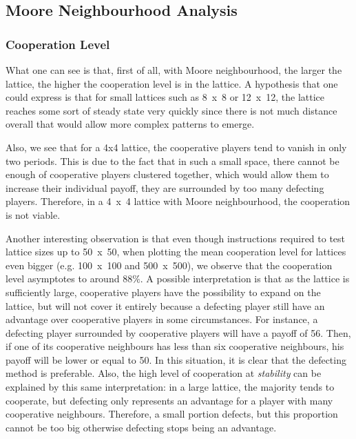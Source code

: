\documentclass{article}
\begin{document}
\subsection{Moore Neighbourhood Analysis}

\subsubsection{Cooperation Level}

What one can see is that, first of all, with Moore neighbourhood, the larger the lattice, the higher the
cooperation level is in the lattice. A hypothesis that one could express is that for small lattices
such as 8~x~8 or 12~x~12, the lattice reaches some sort of steady state very quickly since there is
not much distance overall that would allow more complex patterns to emerge.

Also, we see that for a 4x4 lattice, the cooperative players tend to vanish in only two periods.
This is due to the fact that in such a small space, there cannot be enough of cooperative players
clustered together, which would allow them to increase their individual payoff, they are surrounded
by too many defecting players. Therefore, in a 4~x~4 lattice with Moore neighbourhood, the cooperation
is not viable.

Another interesting observation is that even though instructions required to test lattice sizes up to
50~x~50, when plotting the mean  cooperation level for lattices even bigger (e.g. 100~x~100 and 500~x~500),
we observe that the cooperation level asymptotes to around $88\%$. A possible interpretation is that
as the lattice is sufficiently large, cooperative players have the possibility to expand on the lattice,
but will not cover it entirely because a defecting player still have an advantage over cooperative players
in some circumstances. For instance, a defecting player surrounded by cooperative players will have a
payoff of 56. Then, if one of its cooperative neighbours has less than six cooperative neighbours,
his payoff will be lower or equal to 50. In this situation, it is clear that the defecting method is
preferable. Also, the high level of cooperation at \textit{stability} can be explained by this same
interpretation: in a large lattice, the majority tends to cooperate, but defecting only represents an
advantage for a player with many cooperative neighbours. Therefore, a small portion defects, but this
proportion cannot be too big otherwise defecting stops being an advantage.
\end{document}
